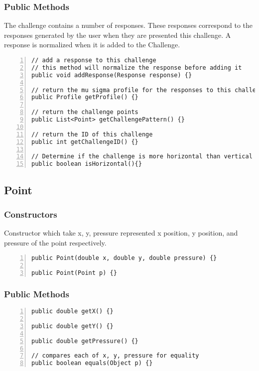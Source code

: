 \documentclass{article} %
\begin{document}
\subsubsection{Public Methods}
The challenge contains a number of responses. These responses correspond to the responses generated by the user when they are presented this challenge. A response is normalized when it is added to the Challenge.
\begin{lstlisting}[numbers=left]
// add a response to this challenge
// this method will normalize the response before adding it
public void addResponse(Response response) {}

// return the mu sigma profile for the responses to this challenge
public Profile getProfile() {}

// return the challenge points
public List<Point> getChallengePattern() {}

// return the ID of this challenge
public int getChallengeID() {}

// Determine if the challenge is more horizontal than vertical in oreantation
public boolean isHorizontal(){}
\end{lstlisting}

\subsection{Point}
\subsubsection{Constructors}
Constructor which take x, y, pressure represented x position, y position, and pressure of the point respectively.
\begin{lstlisting}[numbers=left]
public Point(double x, double y, double pressure) {}

public Point(Point p) {}
\end{lstlisting}

\subsubsection{Public Methods}
\begin{lstlisting}[numbers=left]
public double getX() {}

public double getY() {}

public double getPressure() {}
    
// compares each of x, y, pressure for equality
public boolean equals(Object p) {}
\end{lstlisting}
\end{document}

